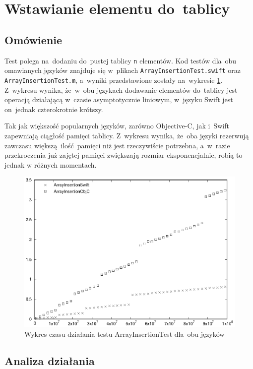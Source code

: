 \documentclass[mgr, shortabstract]{iithesis}
\newcommand{\swiftinline}[1]{
    \texttt{#1}
}
\begin{document}
\section{Wstawianie elementu do~tablicy}

\subsection{Omówienie}

Test polega na~dodaniu do~pustej tablicy \swiftinline{n} elementów. Kod testów dla~obu omawianych języków znajduje się w~plikach \texttt{ArrayInsertionTest.swift} oraz \texttt{ArrayInsertionTest.m}, a~wyniki przedstawione zostały na~wykresie \ref{p:array_insertion}. Z~wykresu wynika, że~w~obu językach dodawanie elementów do~tablicy jest operacją działającą w~czasie asymptotycznie liniowym, w~języku Swift jest on~jednak czterokrotnie krótszy.

Tak jak większość popularnych języków, zarówno Objective-C, jak i~Swift zapewniają ciągłość pamięci tablicy. Z~wykresu wynika, że~oba języki rezerwują zawczasu większą ilość pamięci niż jest rzeczywiście potrzebna, a~w~razie przekroczenia już zajętej pamięci zwiększają rozmiar eksponencjalnie, robią to jednak w różnych momentach.

\begin{figure}[ht]
    \includegraphics{plots/ArrayInsertion.eps}
    \caption{Wykres czasu działania testu ArrayInsertionTest dla~obu języków}
    \label{p:array_insertion}
\end{figure}

\subsection{Analiza działania}
\end{document}
